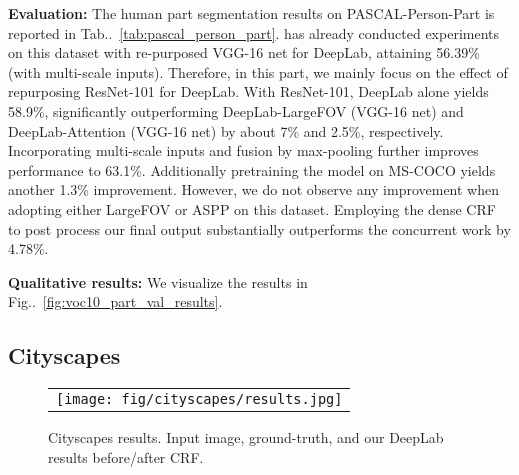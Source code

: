 \documentclass[10pt,journal,compsoc]{IEEEtran}
\makeatletter
\newcommand{\figref}[1]{Fig\onedot~\ref{#1}}
\newcommand{\tabref}[1]{Tab\onedot~\ref{#1}}
\def\onedot{\ifx\@let@token.\else.\null\fi\xspace}
\makeatother
\begin{document}
\textbf{Evaluation:} The human part segmentation results on PASCAL-Person-Part is
reported in \tabref{tab:pascal_person_part}. \cite{chen2015attention} has already
conducted experiments on this dataset with re-purposed VGG-16 net for DeepLab,
attaining 56.39\% (with multi-scale inputs). Therefore, in this part, we mainly
focus on the effect of repurposing ResNet-101 for DeepLab. With ResNet-101,
DeepLab alone yields 58.9\%, significantly outperforming DeepLab-LargeFOV
(VGG-16 net) and DeepLab-Attention (VGG-16 net) by about 7\% and 2.5\%,
respectively. Incorporating multi-scale inputs and fusion by max-pooling
further improves performance to 63.1\%. Additionally pretraining the model on
MS-COCO yields another 1.3\% improvement. However, we do not observe any
improvement when adopting either LargeFOV or ASPP on this dataset. Employing
the dense CRF to post process our final output substantially outperforms the
concurrent work \cite{liang2016semantic} by 4.78\%.

\textbf{Qualitative results:} We visualize the results in \figref{fig:voc10_part_val_results}.

\subsection{Cityscapes}
\label{exp:cityscapes}

\begin{figure*}[!t]
  \centering
\scalebox{1} {
  \begin{tabular}{c}
    \texttt{[image: fig/cityscapes/results.jpg]} \\












\end{tabular}
  }
  \caption{Cityscapes results. Input image, ground-truth,
    and our DeepLab results before/after CRF.}
  \label{fig:cityscapes_val_results}
\end{figure*}
\end{document}
